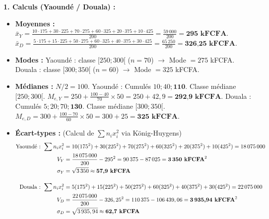 \documentclass[11pt]{article}
\begin{document}
\begin{corrige}
\textbf{1. Calculs (Yaoundé / Douala) :}
\begin{itemize}
    \item \textbf{Moyennes :} 
    $\bar{x}_Y = \frac{10\cdot175 + 30\cdot225 + 70\cdot275 + 60\cdot325 + 20\cdot375 + 10\cdot425}{200} = \frac{59\,000}{200} = \textbf{295 kFCFA}$.
    $\bar{x}_D = \frac{5\cdot175 + 15\cdot225 + 50\cdot275 + 60\cdot325 + 40\cdot375 + 30\cdot425}{200} = \frac{65\,250}{200} = \textbf{326,25 kFCFA}$.
    \item \textbf{Modes :} 
    Yaoundé : classe $[250;300[$ ($n=70$) $\to$ Mode $= 275$ kFCFA. 
    Douala : classe $[300;350[$ ($n=60$) $\to$ Mode $= 325$ kFCFA.
    \item \textbf{Médianes :} $N/2=100$.
    Yaoundé : Cumulés $10; 40; \mathbf{110}$. Classe médiane $[250;300[$. $M_{e,Y} = 250 + \frac{100-40}{70}\times 50 = 250 + 42,9 = \textbf{292,9 kFCFA}$.
    Douala : Cumulés $5; 20; 70; \mathbf{130}$. Classe médiane $[300;350[$. $M_{e,D} = 300 + \frac{100-70}{60}\times 50 = 300 + 25 = \textbf{325 kFCFA}$.
    \item \textbf{Écart-types :} (Calcul de $\sum n_i x_i^2$ via König-Huygens)
    \begin{align*}
    \text{Yaoundé : } \sum n_i x_i^2 &= 10(175^2)+30(225^2)+70(275^2)+60(325^2)+20(375^2)+10(425^2) = 18\,075\,000 \\
    V_Y &= \frac{18\,075\,000}{200} - 295^2 = 90\,375 - 87\,025 = \textbf{3\,350 kFCFA}^2 \\
    \sigma_Y &= \sqrt{3\,350} \approx \textbf{57,9 kFCFA} \\[1em]
    \text{Douala : } \sum n_i x_i^2 &= 5(175^2)+15(225^2)+50(275^2)+60(325^2)+40(375^2)+30(425^2) = 22\,075\,000 \\
    V_D &= \frac{22\,075\,000}{200} - 326,25^2 = 110\,375 - 106\,439,06 = \textbf{3\,935,94 kFCFA}^2 \\
    \sigma_D &= \sqrt{3\,935,94} \approx \textbf{62,7 kFCFA}
    \end{align*}
\end{itemize}


\end{corrige}
\end{document}
